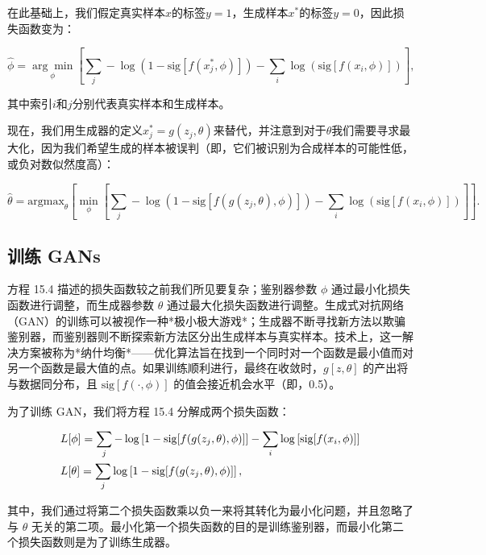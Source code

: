 \documentclass[lang=cn,newtx,10pt,scheme=chinese]{elegantbook}
\begin{document}
在此基础上，我们假定真实样本\(x\)的标签\(y = 1\)，生成样本\(x^*\)的标签\(y = 0\)，因此损失函数变为：

\begin{equation}
\hat{\phi} = \underset{\phi}{\arg\min} \left[ \sum_j -\log \left( 1 - \text{sig}[f(x_j^*, \phi)] \right) - \sum_i \log \left( \text{sig}[f(x_i, \phi)] \right) \right], 
\end{equation}

其中索引\(i\)和\(j\)分别代表真实样本和生成样本。

现在，我们用生成器的定义\(x_j^* = g(z_j, \theta)\)来替代，并注意到对于\(\theta\)我们需要寻求最大化，因为我们希望生成的样本被误判（即，它们被识别为合成样本的可能性低，或负对数似然度高）：

\begin{equation}
\hat{\theta} = \text{argmax}_{\theta} \left[ \min_{\phi} \left[ \sum_j -\log \left(1 - \text{sig}[f(g(z_j, \theta), \phi)] \right) - \sum_i \log \left( \text{sig}[f(x_i, \phi)] \right) \right]  \right]. 
\end{equation}

\subsection{训练 GANs}
方程 15.4 描述的损失函数较之前我们所见要复杂；鉴别器参数 \(\phi\) 通过最小化损失函数进行调整，而生成器参数 \(\theta\) 通过最大化损失函数进行调整。生成式对抗网络（GAN）的训练可以被视作一种*极小极大游戏*；生成器不断寻找新方法以欺骗鉴别器，而鉴别器则不断探索新方法区分出生成样本与真实样本。技术上，这一解决方案被称为*纳什均衡*——优化算法旨在找到一个同时对一个函数是最小值而对另一个函数是最大值的点。如果训练顺利进行，最终在收敛时，\(g[z, \theta]\) 的产出将与数据同分布，且 \(\text{sig}[f(\cdot, \phi)]\) 的值会接近机会水平（即，0.5）。

为了训练 GAN，我们将方程 15.4 分解成两个损失函数：


\begin{align}
&L[\phi] = \sum_j -\log \left[ 1 - \text{sig}[f(g(z_j, \theta), \phi)] \right] - \sum_i \log \left[ \text{sig}[f(x_i, \phi)] \right] \notag \\
&L[\theta] = \sum_j \log \left[ 1 - \text{sig}[f(g(z_j, \theta), \phi)] \right], 
\end{align} 


其中，我们通过将第二个损失函数乘以负一来将其转化为最小化问题，并且忽略了与 \(\theta\) 无关的第二项。最小化第一个损失函数的目的是训练鉴别器，而最小化第二个损失函数则是为了训练生成器。
\end{document}
